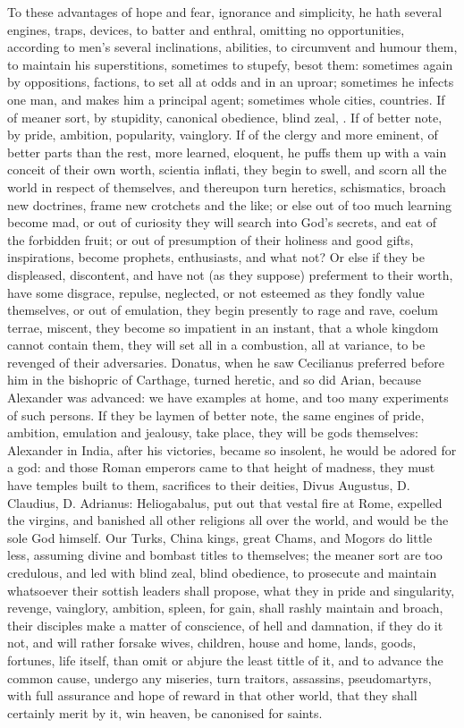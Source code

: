 {To these advantages of hope and fear, ignorance and simplicity, he hath
several engines, traps, devices, to batter and enthral, omitting no
opportunities, according to men's several inclinations, abilities, to
circumvent and humour them, to maintain his superstitions, sometimes to
stupefy, besot them: sometimes again by oppositions, factions, to set
all at odds and in an uproar; sometimes he infects one man, and makes
him a principal agent; sometimes whole cities, countries. If of meaner
sort, by stupidity, canonical obedience, blind zeal, \etc{}. If of better
note, by pride, ambition, popularity, vainglory. If of the clergy and
more eminent, of better parts than the rest, more learned, eloquent, he
puffs them up with a vain conceit of their own worth, scientia inflati,
they begin to swell, and scorn all the world in respect of themselves,
and thereupon turn heretics, schismatics, broach new doctrines, frame
new crotchets and the like; or else out of too much learning become
mad, or out of curiosity they will search into God's secrets, and eat
of the forbidden fruit; or out of presumption of their holiness and
good gifts, inspirations, become prophets, enthusiasts, and what not?
Or else if they be displeased, discontent, and have not (as they
suppose) preferment to their worth, have some disgrace, repulse,
neglected, or not esteemed as they fondly value themselves, or out of
emulation, they begin presently to rage and rave, coelum terrae,
miscent, they become so impatient in an instant, that a whole kingdom
cannot contain them, they will set all in a combustion, all at
variance, to be revenged of their adversaries. Donatus, when he
saw Cecilianus preferred before him in the bishopric of Carthage,
turned heretic, and so did Arian, because Alexander was advanced: we
have examples at home, and too many experiments of such persons. If
they be laymen of better note, the same engines of pride, ambition,
emulation and jealousy, take place, they will be gods themselves:
Alexander in India, after his victories, became so insolent, he
would be adored for a god: and those Roman emperors came to that height
of madness, they must have temples built to them, sacrifices to their
deities, Divus Augustus, D. Claudius, D. Adrianus: Heliogabalus,
put out that vestal fire at Rome, expelled the virgins, and banished
all other religions all over the world, and would be the sole God
himself. Our Turks, China kings, great Chams, and Mogors do little
less, assuming divine and bombast titles to themselves; the meaner sort
are too credulous, and led with blind zeal, blind obedience, to
prosecute and maintain whatsoever their sottish leaders shall propose,
what they in pride and singularity, revenge, vainglory, ambition,
spleen, for gain, shall rashly maintain and broach, their disciples
make a matter of conscience, of hell and damnation, if they do it not,
and will rather forsake wives, children, house and home, lands, goods,
fortunes, life itself, than omit or abjure the least tittle of it, and
to advance the common cause, undergo any miseries, turn traitors,
assassins, pseudomartyrs, with full assurance and hope of reward in
that other world, that they shall certainly merit by it, win heaven, be
canonised for saints.

}
